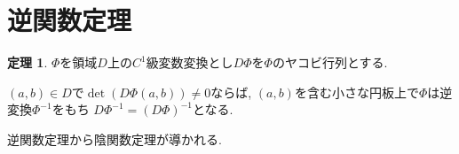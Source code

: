 \documentclass[dvipdfmx,a4paper,11pt]{article}
\theoremstyle{definition}
\newtheorem{thm}{定理}
\begin{document}
 \section{逆関数定理}
 
 \begin{tcolorbox}[
    colback = white,
    colframe = green!35!black,
    fonttitle = \bfseries,
    breakable = true]
    \begin{thm}
    $\Phi$を領域$D$上の$C^1$級変数変換とし$D\Phi$を$\Phi$のヤコビ行列とする.
    
    $(a,b) \in D$で$\det(D\Phi(a,b)) \neq 0$ならば, 
    $(a,b)$を含む小さな円板上で$\Phi$は逆変換$\Phi^{-1}$をもち
    $D\Phi^{-1} = (D\Phi)^{-1}$となる.
    


    \end{thm}
    \end{tcolorbox}
    
逆関数定理から陰関数定理が導かれる.    
 
\end{document}
